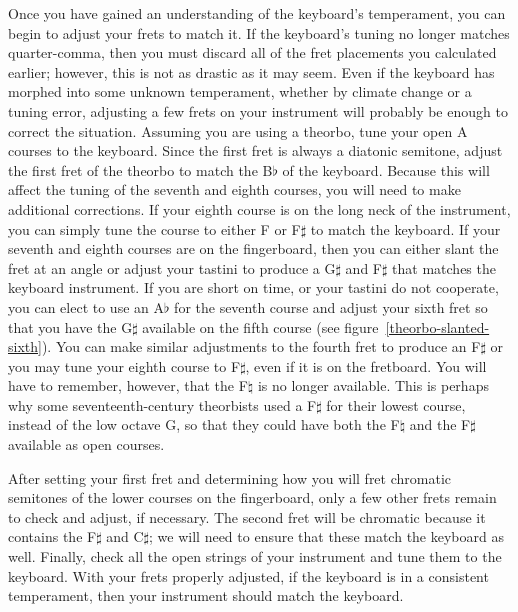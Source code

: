 Once you have gained an understanding of the keyboard's temperament, you can begin to adjust your
frets to match it.  If the keyboard's tuning no longer matches quarter-comma, then you must discard
all of the fret placements you calculated earlier; however, this is not as drastic as it may seem.
Even if the keyboard has morphed into some unknown temperament, whether by climate change or a
tuning error, adjusting a few frets on your instrument will probably be enough to correct the
situation.  Assuming you are using a theorbo, tune your open A courses to the keyboard.  Since the
first fret is always a diatonic semitone, adjust the first fret of the theorbo to match the B$\flat$
of the keyboard.  Because this will affect the tuning of the seventh and eighth courses, you will
need to make additional corrections.  If your eighth course is on the long neck of the instrument,
you can simply tune the course to either F or F$\sharp$ to match the keyboard.  If your seventh and
eighth courses are on the fingerboard, then you can either slant the fret at an angle or adjust your
tastini to produce a G$\sharp$ and F$\sharp$ that matches the keyboard instrument.  If you are short
on time, or your tastini do not  cooperate, you can elect to use an A$\flat$ for the seventh course
and adjust your sixth fret so that you have the G$\sharp$ available on the fifth course (see
figure~\ref{theorbo-slanted-sixth}).  You can make similar adjustments to the fourth fret to produce
an F$\sharp$ or you may tune your eighth course to F$\sharp$, even if it is on the fretboard.  You
will have to remember, however, that the F$\natural$ is no longer available.  This is perhaps why
some seventeenth-century theorbists used a F$\sharp$ for their lowest course, instead of the low
octave G, so that they could have both the F$\natural$ and the F$\sharp$ available as open courses.

After setting your first fret and determining how you will fret chromatic semitones of the lower
courses on the fingerboard, only a few other frets remain to check and adjust, if necessary.  The
second fret will be chromatic because it contains the F$\sharp$ and C$\sharp$; we will need to
ensure that these match the keyboard as well. Finally, check all the open strings of your instrument
and tune them to the keyboard. With your frets properly adjusted, if the keyboard is in a consistent
temperament, then your instrument should match the keyboard.

